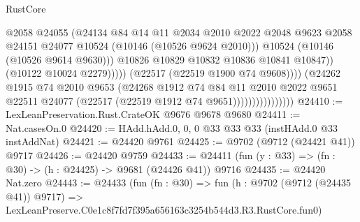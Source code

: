 \begin{lexlean}{RustCore}
\begin{coremodule}
                                              @2058
                                              @24055
                                              (@24134
                                                @84
                                                @14
                                                @11
                                                @2034
                                                @2010
                                                @2022
                                                @2048
                                                @9623
                                                @2058
                                                @24151
                                                @24077
                                                @10524
                                                (@10146 (@10526 @9624 @2010)))
                                              @10524
                                              (@10146 (@10526 @9614 @9630)))
                                            @10826
                                            @10829
                                            @10832
                                            @10836
                                            @10841
                                            @10847))
                                        (@10122 @10024 @2279)))))
                                (@22517 (@22519 @1900 @74 @9608))))
                            (@24262
                              @1915
                              @74
                              @2010
                              @9653
                              (@24268
                                @1912
                                @74
                                @84
                                @11
                                @2010
                                @2022
                                @9651
                                @22511
                                @24077
                                (@22517 (@22519 @1912 @74 @9651))))))))))))))))
@24410 := LexLeanPreservation.Rust.CrateOK @9676 @9678 @9680
@24411 := Nat.casesOn.{0}
@24420 := HAdd.hAdd.{0, 0, 0} @33 @33 @33 (instHAdd.{0} @33 instAddNat)
@24421 := @24420 @9761
@24425 := @9702 (@9712 (@24421 @41)) @9717
@24426 := @24420 @9759
@24433 := @24411 (fun (y : @33) => (fn : @30) -> (h : @24425) -> @9681 (@24426 @41)) @9716
@24435 := @24420 Nat.zero
@24443 := @24433
    (fun (fn : @30) =>
    fun (h : @9702 (@9712 (@24435 @41)) @9717) =>
    LexLeanPreserve.C0e1c8f7fd7f395a656163c3254b544d3.R3.RustCore.fun0)

\end{coremodule}
\end{lexlean}
